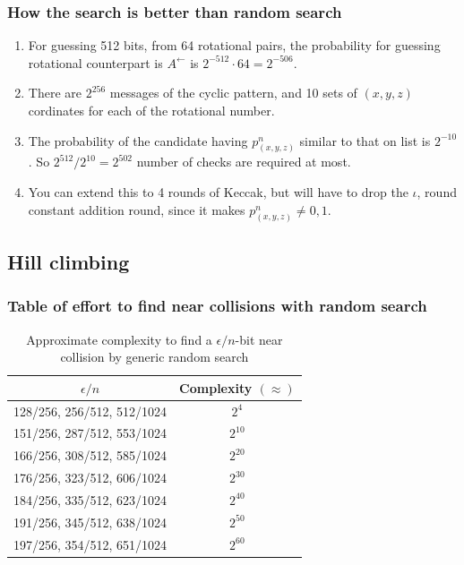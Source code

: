 \documentclass{beamer}
\begin{document}
\begin{frame}
\frametitle{How the search is better than random search}
\begin{enumerate}
\item For guessing 512 bits, from 64 rotational pairs, the probability for guessing rotational counterpart
is $A^{\leftarrow}$ is $2^{-512} \cdot 64 = 2^{-506}$.
\item There are $2^{256}$ messages of the cyclic pattern, and 10 sets of $(x, y, z)$ cordinates for each of
the rotational number.
\item The probability of the candidate having $p^n_{(x, y, z)}$ similar to that on list is $2^{-10}$. 
So $2^{512} / 2^{10} = 2^{502}$ number of checks are required at most.
\item You can extend this to 4 rounds of Keccak, but will have to drop the $\iota$, round constant addition
round, since it makes $p^n_{(x, y, z)} \neq 0, 1$.
\end{enumerate}
\end{frame}

\subsection{Hill climbing}

\begin{frame}
\frametitle{Table of effort to find near collisions with random search}
\begin{table}
  \begin{center}
    \begin{tabular}{ | c | c | } \hline
      $\epsilon / n $            & Complexity $( \approx )$ \\ \hline
      128/256, 256/512, 512/1024 & $2^{4}$ \\ \hline
      151/256, 287/512, 553/1024 & $2^{10}$ \\ \hline
      166/256, 308/512, 585/1024 & $2^{20}$ \\ \hline
      176/256, 323/512, 606/1024 & $2^{30}$ \\ \hline
      184/256, 335/512, 623/1024 & $2^{40}$ \\ \hline
      191/256, 345/512, 638/1024 & $2^{50}$ \\ \hline
      197/256, 354/512, 651/1024 & $2^{60}$ \\ \hline
    \end{tabular}
    \caption{Approximate complexity to find a $\epsilon / n$-bit near collision by generic random search
    \footnotemark}
  \end{center}
\end{table}
\end{frame}
\end{document}
